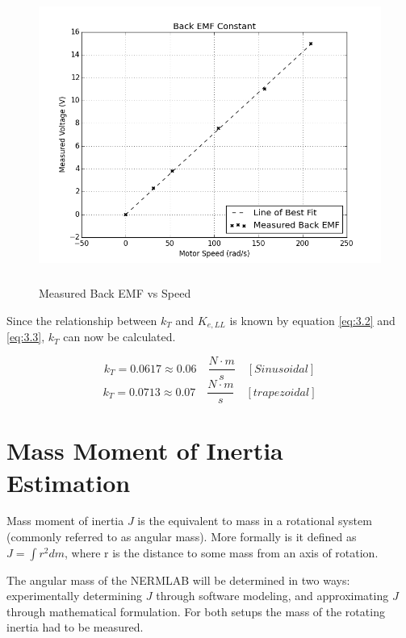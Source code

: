 \begin{figure}[H]%
	\begin{center}
		\includegraphics[height=3.8in]{figures/back_emf_plot.png}
		
		\caption[Measured Back EMF vs Speed]{Measured Back EMF vs Speed}
		
		\label{back_emf_plot}
	\end{center}
\end{figure}

Since the relationship between \(k_T\) and \(K_{e,LL}\) is known by equation \ref{eq:3.2} and \ref{eq:3.3}, \(k_T\) can now be calculated.
\begin{tcolorbox}[
    standard jigsaw,
    opacityback=0]
\[k_T = 0.0617 \approx 0.06 \quad \frac{N \cdot m}{s} \quad [Sinusoidal]\]
\[k_T =  0.0713 \approx 0.07 \quad  \frac{N \cdot m}{s} \quad [trapezoidal]\]
\end{tcolorbox}

\newpage
\section{Mass Moment of Inertia Estimation}
Mass moment of inertia \(J\) is the equivalent to mass in a rotational system (commonly referred to as angular mass). More formally is it defined as \(J = \int r^2 dm\), where r is the distance to some mass from an axis of rotation.

The angular mass of the NERMLAB will be determined in two ways: experimentally determining \(J\) through software modeling, and approximating \(J\) through mathematical formulation. For both setups the mass of the rotating inertia had to be measured.

